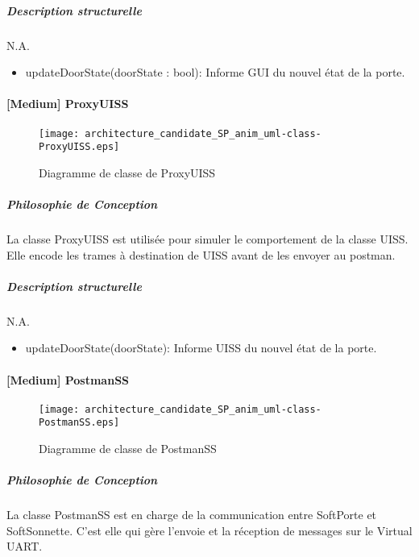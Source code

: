         \subparagraph{Description structurelle}%
        N.A.
        \begin{itemize}
            \item {updateDoorState(doorState : bool): Informe GUI du nouvel état de la porte.}
        \end{itemize}

\newpage

        \paragraph{[Medium] ProxyUISS}%

        \begin{figure} [H]
            \centering
            \texttt{[image: architecture\_candidate\_SP\_anim\_uml-class-ProxyUISS.eps]}
            \caption{Diagramme de classe de ProxyUISS}
            \label{Class-ProxyUISS}
        \end{figure}
        \subparagraph{Philosophie de Conception}%
        La classe ProxyUISS est utilisée pour simuler le comportement de la classe UISS.
        Elle encode les trames à destination de UISS avant de les envoyer au postman.
        
        \subparagraph{Description structurelle}%
        N.A.
        \begin{itemize}
            \item {updateDoorState(doorState): Informe UISS du nouvel état de la porte.}
        \end{itemize}

\newpage
    
        \paragraph{[Medium] PostmanSS}%
        \begin{figure} [H]
            \centering
            \texttt{[image: architecture\_candidate\_SP\_anim\_uml-class-PostmanSS.eps]}
            \caption{Diagramme de classe de PostmanSS}
            \label{Class-PostmanSS_SP}
        \end{figure}
        \subparagraph{Philosophie de Conception}%
        La classe PostmanSS est en charge de la communication entre SoftPorte et SoftSonnette.
        C'est elle qui gère l'envoie et la réception de messages sur le Virtual UART.
        
